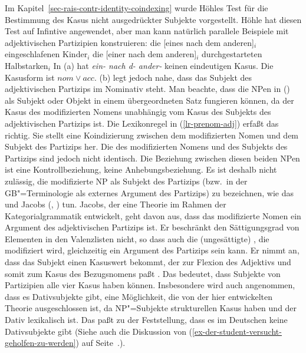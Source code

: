 {Im Kapitel~\ref{sec-rais-contr-identity-coindexing} wurde Höhles Test \citeyearpar[Kapitel~6]{Hoehle83a}
für die Bestimmung des Kasus nicht ausgedrückter Subjekte vorgestellt. Höhle hat diesen Test auf
Infintive angewendet, aber man kann natürlich parallele Beispiele mit adjektivischen Partizipien konstruieren:
\eal
\label{ex-subj-case-adjectival-part}
\ex
die [eines         nach  dem           anderen]$_i$ eingeschlafenen Kinder$_i$
\ex
die [einer         nach  dem           anderen]$_i$ durchgestarteten Halbstarken$_i$
\zl
In (a) hat {\em ein- nach d- ander-} keinen eindeutigen Kasus. Die
Kasusform ist $nom \vee acc$. (b) legt jedoch nahe, dass das Subjekt des adjektivischen
Partizips im Nominativ steht. Man beachte, dass die NPen in () als Subjekt oder Objekt in
einem übergeordneten Satz fungieren können, da der Kasus des modifizierten Nomens unabhängig vom
Kasus des Subjekts des adjektivischen Partizips ist. Die Lexikonregel in (\ref{lr-prenom-adj})
erfaßt das richtig. Sie stellt eine Koindizierung zwischen dem modifizierten Nomen und
dem Subjekt des Partizips her. Die \synsemwe des modifizierten Nomens und des Subjekts des Partizips
sind jedoch nicht identisch. Die Beziehung zwischen diesen beiden NPen ist eine Kontrollbeziehung,
keine Anhebungsbeziehung.
Es ist deshalb nicht zulässig, die modifizierte NP als Subjekt des Partizips (bzw.\ in der
GB"=Terminologie als externes Argument des Partizips) zu bezeichnen, wie das \zb
\citet[]{LR86a} und Jacobs
(\citeyear[]{Jacobs91a}, \citeyear[]{Jacobs92a-u}) tun. Jacobs, der eine Theorie im Rahmen der
Kategorialgrammatik entwickelt, geht davon aus, dass das modifizierte
Nomen ein Argument des adjektivischen Partizips ist. Er beschränkt den Sättigungsgrad von Elementen
in den Valenzlisten nicht, so dass auch die (ungesättigte) \nbar, die modifiziert wird, gleichzeitig
ein Argument des Partizips sein kann. Er nimmt an, dass das Subjekt einen Kasuswert bekommt, der zur 
Flexion des Adjektivs und somit zum Kasus des Bezugsnomens paßt \citep[]{Jacobs91a}. %
Das bedeutet, dass Subjekte von Partizipien alle vier Kasus haben können. Insbesondere wird auch angenommen, dass es
Dativsubjekte gibt, eine Möglichkeit, die von der hier entwickelten Theorie ausgeschlossen ist, da
NP"=Subjekte strukturellen Kasus haben und der Dativ lexikalisch ist. Das paßt zu der Feststellung,
dass es im Deutschen keine Dativsubjekte gibt (Siehe auch die Diskussion von
(\ref{ex-der-student-versucht-geholfen-zu-werden}) auf
Seite~\pageref{ex-der-student-versucht-geholfen-zu-werden}.).
%


}
